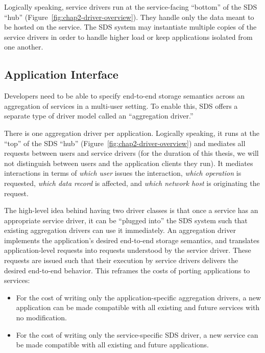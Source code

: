 Logically speaking, service drivers run at the service-facing ``bottom'' of the
SDS ``hub'' (Figure~\ref{fig:chap2-driver-overview}).
They handle only the data meant to be hosted on the service.  The SDS system may
instantiate multiple copies of the service drivers in order to handle higher
load or keep applications isolated from one another.

\subsection{Application Interface}

Developers need to be able to specify
end-to-end storage semantics across an aggregation of services
in a multi-user setting.  To enable this,
SDS offers a separate type of driver model called an ``aggregation
driver.''

There is one aggregation driver per application.  Logically speaking, it runs at
the ``top'' of the SDS ``hub'' (Figure~\ref{fig:chap2-driver-overview})
and mediates all requests between users and
service drivers (for the duration of this thesis, we will not
distinguish between users and the application clients
they run).  It mediates interactions in terms of \emph{which user} issues the
interaction, \emph{which operation} is requested, \emph{which data
record} is affected, and \emph{which network host} is originating the request.

The high-level idea behind having two driver classes is that once a service has an appropriate service driver,
it can be ``plugged into'' the SDS system such that existing aggregation drivers
can use it immediately.  An aggregation driver implements the application's desired end-to-end storage
semantics, and translates
application-level requests into requests understood by the service driver.  These
requests are issued such that their execution
by service drivers delivers the desired end-to-end behavior.  This reframes the
costs of porting applications to services:

\begin{itemize}
    \item For the cost of writing only the application-specific
aggregation drivers, a new application can be made
compatible with all existing and future services with no modification.
    \item For the cost of writing only the service-specific SDS driver, a new
service can be made compatible with all existing and future applications.
\end{itemize}

